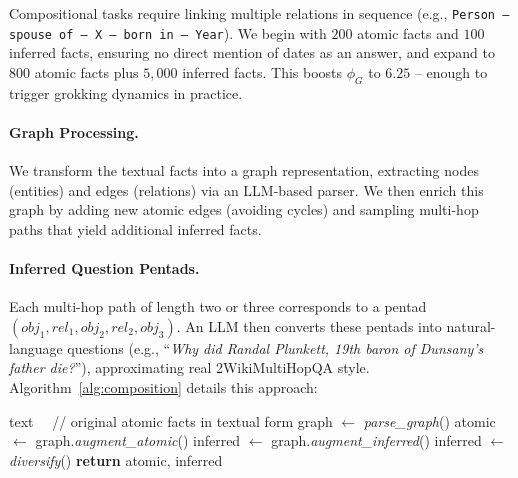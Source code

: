             Compositional tasks require linking multiple relations in sequence (e.g., \texttt{Person -- spouse of -- X -- born in -- Year}). 
            We begin with $200$ atomic facts and $100$ inferred facts, ensuring no direct mention of dates as an answer, and expand to $800$ atomic facts plus $5{,}000$ inferred facts. This boosts $\phi_G$ to $6.25$ -- enough to trigger grokking dynamics in practice.
            
            \paragraph{Graph Processing.}
                We transform the textual facts into a graph representation, extracting nodes (entities) and edges (relations) via an LLM-based parser. 
                We then enrich this graph by adding new atomic edges (avoiding cycles) and sampling multi-hop paths that yield additional inferred facts.
            
            \paragraph{Inferred Question Pentads.}
                Each multi-hop path of length two or three corresponds to a pentad \((obj_1, rel_1, obj_2, rel_2, obj_3)\). 
                An LLM then converts these pentads into natural-language questions (e.g., “\emph{Why did Randal Plunkett, 19th baron of Dunsany's father die?}”), approximating real 2WikiMultiHopQA style. 
                Algorithm~\ref{alg:composition} details this approach:
                
                \begin{algorithm}[tb]
                \small
                \caption{Augmentation algorithm for composition}
                \label{alg:composition}    
                    \begin{algorithmic}[1]
                        \REQUIRE text ~~// original atomic facts in textual form
                        \STATE graph $\gets$ \textit{parse\_graph}()
                        \STATE atomic $\gets$ graph.\textit{augment\_atomic}()
                        \STATE inferred $\gets$ graph.\textit{augment\_inferred}()
                        \STATE inferred $\gets$ \textit{diversify}()
                        \STATE \textbf{return} atomic, inferred
                    \end{algorithmic}
                \end{algorithm}
                

